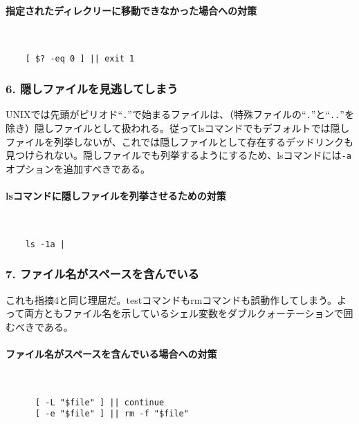 \paragraph{指定されたディレクリーに移動できなかった場合への対策} 　\\
\begin{frameboxit}{160.0mm}
\begin{verbatim}
	[ $? -eq 0 ] || exit 1
\end{verbatim}
\end{frameboxit}

\subsubsection*{6. 隠しファイルを見逃してしまう}

UNIXでは先頭がピリオド``\verb|.|''で始まるファイルは、（特殊ファイルの``\verb|.|''と``\verb|..|''を除き）隠しファイルとして扱われる。従ってlsコマンドでもデフォルトでは隠しファイルを列挙しないが、これでは隠しファイルとして存在するデッドリンクも見つけられない。隠しファイルでも列挙するようにするため、lsコマンドには\verb|-a|オプションを追加すべきである。

\paragraph{lsコマンドに隠しファイルを列挙させるための対策} 　\\
\begin{frameboxit}{160.0mm}
\begin{verbatim}
	ls -1a |
\end{verbatim}
\end{frameboxit}

\subsubsection*{7. ファイル名がスペースを含んでいる}

これも指摘4と同じ理屈だ。testコマンドもrmコマンドも誤動作してしまう。よって両方ともファイル名を示しているシェル変数をダブルクォーテーションで囲むべきである。

\paragraph{ファイル名がスペースを含んでいる場合への対策} 　\\
\begin{frameboxit}{160.0mm}
\begin{verbatim}
	  [ -L "$file" ] || continue
	  [ -e "$file" ] || rm -f "$file"
\end{verbatim}
\end{frameboxit}


